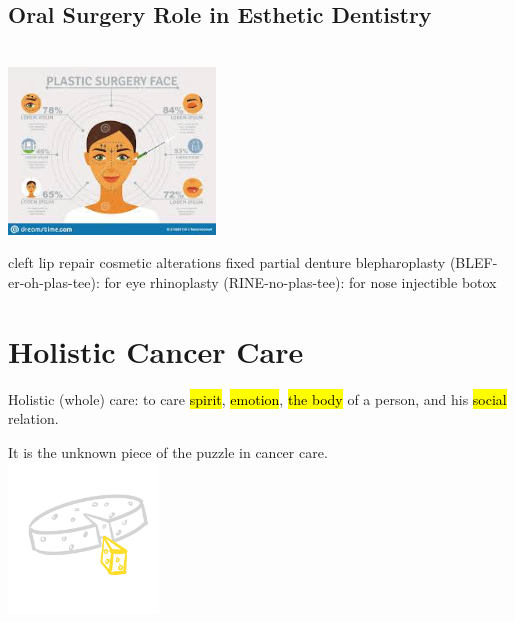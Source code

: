 \documentclass[
paper=landscape,
paper=160mm:90mm, %
fontsize=11pt, %
pagesize, %
parskip=half-, %
]{scrartcl} %
\newenvironment{WrapText1}[3][r]
{\wrapfigure[#2]{#1}{#3}}
{\endwrapfigure}
\newcommand{\wrapr}[6]{
\begin{minipage}{\linewidth}\mbox{}\\
\vspace{#1}
\begin{WrapText1}{#2}{#3}
\vspace{#4}#5\end{WrapText1}#6
\end{minipage}}
\theoremstyle{mythmstyle} %
\begin{document}
\clearpage
\subsection{Oral Surgery Role in Esthetic Dentistry}


\wrapr{-8mm}{7}{6cm}{-1mm}
{%
\includegraphics[width=5.5cm]{plastic_face.jpeg}
} %
{%
\begin{outline}

\1 cleft lip repair
\1 cosmetic alterations
    \2 fixed partial denture
    \2 blepharoplasty (BLEF-er-oh-plas-tee): for eye
    \2 rhinoplasty (RINE-no-plas-tee): for nose
    \2 injectible botox
\end{outline}
} %
\clearpage

%




\section*{Holistic Cancer Care} 

\thispagestyle{headings}

Holistic (whole) care: to care \hl{spirit}, \hl{emotion}, \hl{the body} of a person, and his \hl{social} relation.

It is the unknown piece of the puzzle in cancer care.\\
\includegraphics[width=4cm]{piece.jpg}
\end{document}

